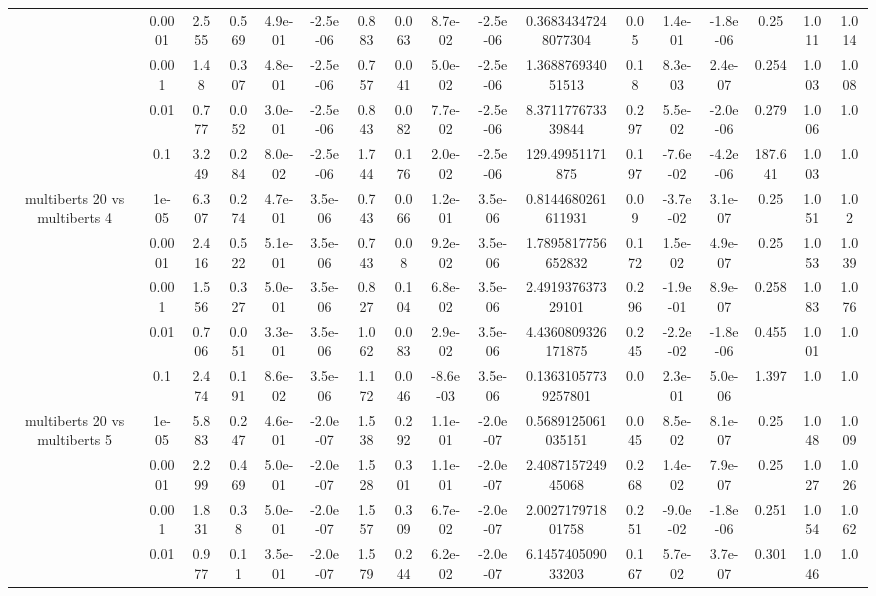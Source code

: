 \begin{tabular}{|c|c|c|c|c|c|c|c|c|c|c|c|c|c|c|c|c|}
 & 0.0001 & 2.555 & 0.569 & 4.9e-01 & -2.5e-06 & 0.883 & 0.063 & 8.7e-02 & -2.5e-06 & 0.36834347248077304 & 0.05 & 1.4e-01 & -1.8e-06 & 0.25 & 1.011 & 1.014 \\
 & 0.001 & 1.48 & 0.307 & 4.8e-01 & -2.5e-06 & 0.757 & 0.041 & 5.0e-02 & -2.5e-06 & 1.368876934051513 & 0.18 & 8.3e-03 & 2.4e-07 & 0.254 & 1.003 & 1.008 \\
 & 0.01 & 0.777 & 0.052 & 3.0e-01 & -2.5e-06 & 0.843 & 0.082 & 7.7e-02 & -2.5e-06 & 8.371177673339844 & 0.297 & 5.5e-02 & -2.0e-06 & 0.279 & 1.006 & 1.0 \\
 & 0.1 & 3.249 & 0.284 & 8.0e-02 & -2.5e-06 & 1.744 & 0.176 & 2.0e-02 & -2.5e-06 & 129.49951171875 & 0.197 & -7.6e-02 & -4.2e-06 & 187.641 & 1.003 & 1.0 \\
\hline
\multirow{5}{*}{multiberts 20 vs multiberts 4} & 1e-05 & 6.307 & 0.274 & 4.7e-01 & 3.5e-06 & 0.743 & 0.066 & 1.2e-01 & 3.5e-06 & 0.8144680261611931 & 0.09 & -3.7e-02 & 3.1e-07 & 0.25 & 1.051 & 1.02 \\
 & 0.0001 & 2.416 & 0.522 & 5.1e-01 & 3.5e-06 & 0.743 & 0.08 & 9.2e-02 & 3.5e-06 & 1.7895817756652832 & 0.172 & 1.5e-02 & 4.9e-07 & 0.25 & 1.053 & 1.039 \\
 & 0.001 & 1.556 & 0.327 & 5.0e-01 & 3.5e-06 & 0.827 & 0.104 & 6.8e-02 & 3.5e-06 & 2.491937637329101 & 0.296 & -1.9e-01 & 8.9e-07 & 0.258 & 1.083 & 1.076 \\
 & 0.01 & 0.706 & 0.051 & 3.3e-01 & 3.5e-06 & 1.062 & 0.083 & 2.9e-02 & 3.5e-06 & 4.4360809326171875 & 0.245 & -2.2e-02 & -1.8e-06 & 0.455 & 1.001 & 1.0 \\
 & 0.1 & 2.474 & 0.191 & 8.6e-02 & 3.5e-06 & 1.172 & 0.046 & -8.6e-03 & 3.5e-06 & 0.13631057739257801 & 0.0 & 2.3e-01 & 5.0e-06 & 1.397 & 1.0 & 1.0 \\
\hline
\multirow{5}{*}{multiberts 20 vs multiberts 5} & 1e-05 & 5.883 & 0.247 & 4.6e-01 & -2.0e-07 & 1.538 & 0.292 & 1.1e-01 & -2.0e-07 & 0.5689125061035151 & 0.045 & 8.5e-02 & 8.1e-07 & 0.25 & 1.048 & 1.009 \\
 & 0.0001 & 2.299 & 0.469 & 5.0e-01 & -2.0e-07 & 1.528 & 0.301 & 1.1e-01 & -2.0e-07 & 2.408715724945068 & 0.268 & 1.4e-02 & 7.9e-07 & 0.25 & 1.027 & 1.026 \\
 & 0.001 & 1.831 & 0.38 & 5.0e-01 & -2.0e-07 & 1.557 & 0.309 & 6.7e-02 & -2.0e-07 & 2.002717971801758 & 0.251 & -9.0e-02 & -1.8e-06 & 0.251 & 1.054 & 1.062 \\
 & 0.01 & 0.977 & 0.11 & 3.5e-01 & -2.0e-07 & 1.579 & 0.244 & 6.2e-02 & -2.0e-07 & 6.145740509033203 & 0.167 & 5.7e-02 & 3.7e-07 & 0.301 & 1.046 & 1.0 \\

\end{tabular}
